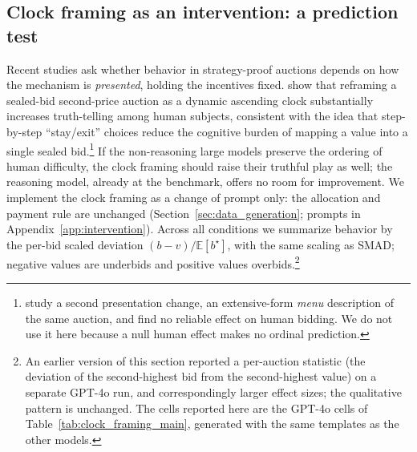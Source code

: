 \documentclass{article} %
\newif\ifmarkrev
\newcommand{\rev}[1]{\ifmarkrev\begingroup\color{red}#1\endgroup\else#1\fi}
\begin{document}
\subsection{\texorpdfstring{\rev{Clock framing as an intervention: a prediction test}}{Clock framing as an intervention: a prediction test}}\label{session:Intervention}

\rev{Recent studies ask whether behavior in strategy-proof auctions depends on how the mechanism is \emph{presented}, holding the incentives fixed. \citet{breitmoser2022obviousness} show that reframing a sealed-bid second-price auction as a dynamic ascending clock substantially increases truth-telling among human subjects, consistent with the idea that step-by-step ``stay/exit'' choices reduce the cognitive burden of mapping a value into a single sealed bid.\footnote{\citet{gonczarowski2023strategyproofness} study a second presentation change, an extensive-form \emph{menu} description of the same auction, and find no reliable effect on human bidding. We do not use it here because a null human effect makes no ordinal prediction.} If the non-reasoning large models preserve the ordering of human difficulty, the clock framing should raise their truthful play as well; the reasoning model, already at the benchmark, offers no room for improvement. We implement the clock framing as a change of prompt only: the allocation and payment rule are unchanged (Section~\ref{sec:data_generation}; prompts in Appendix~\ref{app:intervention}). Across all conditions we summarize behavior by the per-bid scaled deviation $(b-v)/\mathbb{E}[b^\star]$, with the same scaling as SMAD; negative values are underbids and positive values overbids.\footnote{An earlier version of this section reported a per-auction statistic (the deviation of the second-highest bid from the second-highest value) on a separate GPT-4o run, and correspondingly larger effect sizes; the qualitative pattern is unchanged. The cells reported here are the GPT-4o cells of Table~\ref{tab:clock_framing_main}, generated with the same templates as the other models.}}
\end{document}
